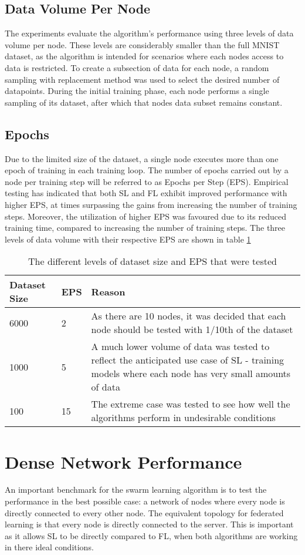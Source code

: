 \subsection{Data Volume Per Node}
The experiments evaluate the algorithm's performance using three levels of data volume per node. These levels are considerably smaller than the full MNIST dataset, as the algorithm is intended for scenarios where each nodes access to data is restricted. To create a subsection of data for each node, a random sampling with replacement method was used to select the desired number of datapoints. During the initial training phase, each node performs a single sampling of its dataset, after which that nodes data subset remains constant.

\subsection{Epochs}
Due to the limited size of the dataset, a single node executes more than one epoch of training in each training loop. The number of epochs carried out by a node per training step will be referred to as Epochs per Step (EPS). Empirical testing has indicated that both SL and FL exhibit improved performance with higher EPS, at times surpassing the gains from increasing the number of training steps. Moreover, the utilization of higher EPS was favoured due to its reduced training time, compared to increasing the number of training steps. The three levels of data volume with their respective EPS are shown in table \ref{epsparams}

\begin{table}[H]
	\begin{tabular}{p{1.5cm}|l|p{10cm}}
		Dataset Size & EPS & Reason \\ \hline \hline
		6000  & 2  & As there are 10 nodes, it was decided that each node should be tested with 1/10th of the dataset \\ \hline
		1000   & 5   & A much lower volume of data was tested to reflect the anticipated use case of SL - training models where each node has very small amounts of data \\ \hline
		100  & 15  & The extreme case was tested to see how well the algorithms perform in undesirable conditions	\end{tabular}
	\caption{The different levels of dataset size and EPS that were tested} \label{epsparams}
\end{table}

\section{Dense Network Performance}
An important benchmark for the swarm learning algorithm is to test the performance in the best possible case: a network of nodes where every node is directly connected to every other node. The equivalent topology for federated learning is that every node is directly connected to the server. This is important as it allows SL to be directly compared to FL, when both algorithms are working in there ideal conditions.

